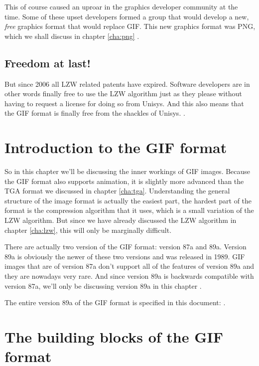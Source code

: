 \begin{refsection}
  This of course caused an uproar in the graphics developer community
  at the time. Some of these upset developers formed a group that
  would develop a new, \textit{free} graphics format that would replace
  GIF. This new graphics format was PNG, which we shall discuss in
  chapter \ref{cha:png}
  \cite{roelofs09:_histor_portab_networ_graph_png_format,caie:_sad}.

  \subsection{Freedom at last!}

  But since 2006 all LZW related patents have expired. Software
  developers are in other words finally free to use the LZW algorithm
  just as they please without having to request a license for doing so
  from Unisys. And this also means that the GIF format is finally free
  from the shackles of Unisys. \cite{caie:_sad}.

  \section{Introduction to the GIF format}

  So in this chapter we'll be discussing the inner workings of GIF
  images. Because the GIF format also supports animation, it is
  slightly more advanced than the TGA format we discussed in chapter
  \ref{cha:tga}. Understanding the general structure of the image
  format is actually the easiest part, the hardest part of the format
  is the compression algorithm that it uses, which is a small
  variation of the LZW algorithm. But since we have already discussed
  the LZW algorithm in chapter \ref{cha:lzw}, this will only be
  marginally difficult.

  There are actually two version of the GIF format: version 87a and
  89a. Version 89a is obviously the newer of these two versions and
  was released in 1989. GIF images that are of version 87a don't
  support all of the features of version 89a and they are nowadays
  very rare. And since version 89a is backwards compatible with
  version 87a, we'll only be discussing version 89a in this chapter
  \cite{gif89a,gif87a}.

  The entire version 89a of the GIF format is specified in this
  document: \cite{gif89a}.

  \section{The building blocks of the GIF format}


\end{refsection}
